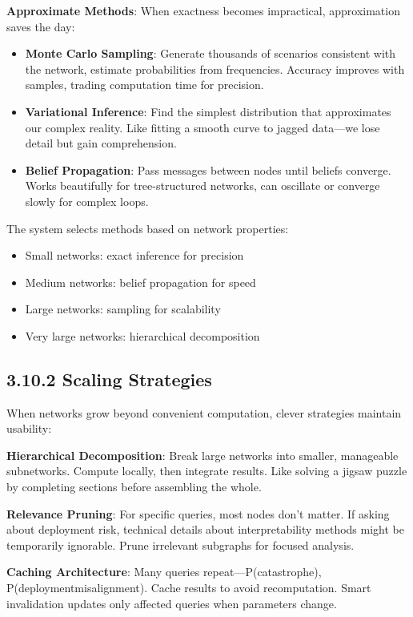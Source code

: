 \documentclass[
  11pt,
  letterpaper,
]{book}
\providecommand{\tightlist}{%
  \setlength{\itemsep}{0pt}\setlength{\parskip}{0pt}}
\begin{document}
\textbf{Approximate Methods}: When exactness becomes impractical,
approximation saves the day:

\begin{itemize}
\tightlist
\item
  \textbf{Monte Carlo Sampling}: Generate thousands of scenarios
  consistent with the network, estimate probabilities from frequencies.
  Accuracy improves with samples, trading computation time for
  precision.
\item
  \textbf{Variational Inference}: Find the simplest distribution that
  approximates our complex reality. Like fitting a smooth curve to
  jagged data---we lose detail but gain comprehension.
\item
  \textbf{Belief Propagation}: Pass messages between nodes until beliefs
  converge. Works beautifully for tree-structured networks, can
  oscillate or converge slowly for complex loops.
\end{itemize}

The system selects methods based on network properties:

\begin{itemize}
\tightlist
\item
  Small networks: exact inference for precision
\item
  Medium networks: belief propagation for speed
\item
  Large networks: sampling for scalability
\item
  Very large networks: hierarchical decomposition
\end{itemize}

\subsection{3.10.2 Scaling Strategies}\label{sec-scaling-strategies}

When networks grow beyond convenient computation, clever strategies
maintain usability:

\textbf{Hierarchical Decomposition}: Break large networks into smaller,
manageable subnetworks. Compute locally, then integrate results. Like
solving a jigsaw puzzle by completing sections before assembling the
whole.

\textbf{Relevance Pruning}: For specific queries, most nodes don't
matter. If asking about deployment risk, technical details about
interpretability methods might be temporarily ignorable. Prune
irrelevant subgraphs for focused analysis.

\textbf{Caching Architecture}: Many queries repeat---P(catastrophe),
P(deployment\textbar misalignment). Cache results to avoid
recomputation. Smart invalidation updates only affected queries when
parameters change.
\end{document}
